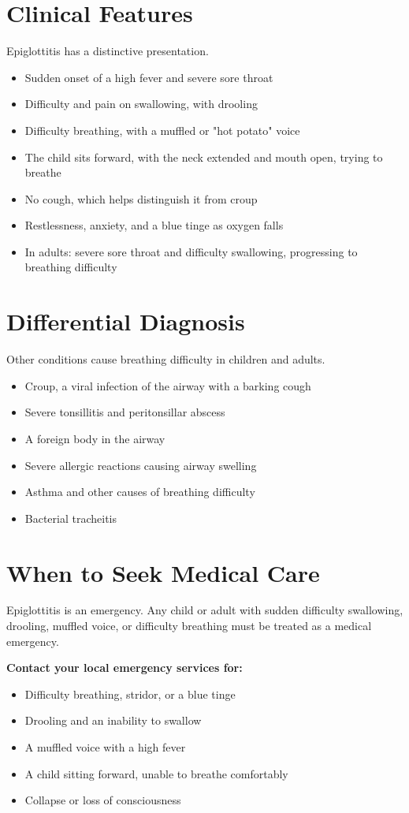 \section*{Clinical Features}
Epiglottitis has a distinctive presentation.
\begin{itemize}
    \item Sudden onset of a high fever and severe sore throat
    \item Difficulty and pain on swallowing, with drooling
    \item Difficulty breathing, with a muffled or "hot potato" voice
    \item The child sits forward, with the neck extended and mouth open, trying to breathe
    \item No cough, which helps distinguish it from croup
    \item Restlessness, anxiety, and a blue tinge as oxygen falls
    \item In adults: severe sore throat and difficulty swallowing, progressing to breathing difficulty
\end{itemize}

\section*{Differential Diagnosis}
Other conditions cause breathing difficulty in children and adults.
\begin{itemize}
    \item Croup, a viral infection of the airway with a barking cough
    \item Severe tonsillitis and peritonsillar abscess
    \item A foreign body in the airway
    \item Severe allergic reactions causing airway swelling
    \item Asthma and other causes of breathing difficulty
    \item Bacterial tracheitis
\end{itemize}

\section*{When to Seek Medical Care}
Epiglottitis is an emergency. Any child or adult with sudden difficulty swallowing, drooling, muffled voice, or difficulty breathing must be treated as a medical emergency.

\textbf{Contact your local emergency services for:}
\begin{itemize}
    \item Difficulty breathing, stridor, or a blue tinge
    \item Drooling and an inability to swallow
    \item A muffled voice with a high fever
    \item A child sitting forward, unable to breathe comfortably
    \item Collapse or loss of consciousness
\end{itemize}

